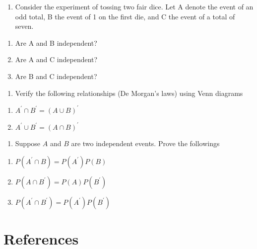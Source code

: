 \documentclass[]{book}
\providecommand{\tightlist}{%
  \setlength{\itemsep}{0pt}\setlength{\parskip}{0pt}}
\begin{document}
\begin{enumerate}
\def\labelenumi{\arabic{enumi}.}
\setcounter{enumi}{22}
\tightlist
\item
  Consider the experiment of tossing two fair dice. Let A denote the event of an odd total, B the event of 1 on the ﬁrst die, and C the event of a total of seven.
\end{enumerate}

\begin{enumerate}
\def\labelenumi{(\alph{enumi})}
\tightlist
\item
  Are A and B independent?
\item
  Are A and C independent?
\item
  Are B and C independent?
\end{enumerate}

\begin{enumerate}
\def\labelenumi{\arabic{enumi}.}
\setcounter{enumi}{23}
\tightlist
\item
  Verify the following relationships (De Morgan's laws) using Venn diagrams
\end{enumerate}

\begin{enumerate}
\def\labelenumi{(\alph{enumi})}
\tightlist
\item
  \(A^\prime \cap B^\prime = (A\cup B)^\prime\)
\item
  \(A^\prime \cup B^\prime = (A\cap B)^\prime\)
\end{enumerate}

\begin{enumerate}
\def\labelenumi{\arabic{enumi}.}
\setcounter{enumi}{24}
\tightlist
\item
  Suppose \(A\) and \(B\) are two independent events. Prove the followings
\end{enumerate}

\begin{enumerate}
\def\labelenumi{(\alph{enumi})}
\tightlist
\item
  \(P(A^\prime \cap B)=P(A^\prime)P(B)\)
\item
  \(P(A\cap B^\prime)=P(A)P(B^\prime)\)
\item
  \(P(A^\prime \cap B^\prime)=P(A^\prime)P(B^\prime)\)
\end{enumerate}

\hypertarget{references-6}{%
\section*{References}\label{references-6}}
\end{document}
